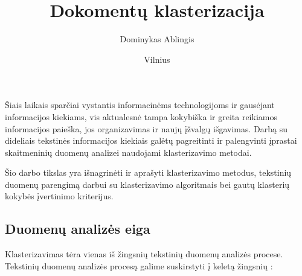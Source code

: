 \documentclass{VUMIFInfKursinis}
\title{Dokomentų klasterizacija}
\author{Dominykas Ablingis}
\date{Vilnius \\ \the\year}
\begin{document}
\maketitle

\tableofcontents

Šiais laikais sparčiai vystantis informacinėms technologijoms ir
gausėjant informacijos kiekiams, vis aktualesnė tampa kokybiška ir
greita reikiamos informacijos paieška, jos organizavimas ir naujų
įžvalgų išgavimas. Darbą su dideliais tekstinės informacijos kiekiais
galėtų pagreitinti ir palengvinti įprastai skaitmeninių duomenų analizei
naudojami klasterizavimo metodai.

Šio darbo tikslas yra išnagrinėti ir aprašyti klasterizavimo metodus,
tekstinių duomenų parengimą darbui su klasterizavimo algoritmais bei
gautų klasterių kokybės įvertinimo kriterijus.




\subsection*{Duomenų analizės eiga}

Klasterizavimas tėra vienas iš žingsnių tekstinių duomenų analizės
procese. Tekstinių duomenų analizės procesą galime suskirstyti į keletą
žingsnių \cite{fayyad1996data}:
\end{document}
